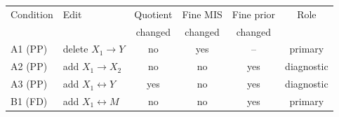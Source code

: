 \begin{tabular}{llcccc}
\hline
Condition & Edit & Quotient & Fine MIS & Fine prior & Role\\
 & & changed & changed & changed & \\
\hline
A1 (PP) & delete $X_1\to Y$ & no & yes & -- & primary\\
A2 (PP) & add $X_1\to X_2$ & no & no & yes & diagnostic\\
A3 (PP) & add $X_1\leftrightarrow Y$ & yes & no & yes & diagnostic\\
B1 (FD) & add $X_1\leftrightarrow M$ & no & no & yes & primary\\
\hline
\end{tabular}
